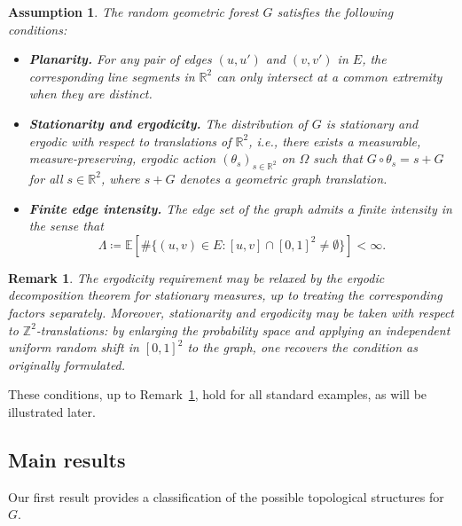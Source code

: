 \documentclass[a4paper, 11pt]{article} %
\theoremstyle{plain}
\newtheorem{remark}[theorem]{Remark}
\newtheorem{assumption}{Assumption}
\newcommand{\E}{\mathbb{E}}
\newcommand{\R}{\mathbb{R}}
\newcommand{\Z}{\mathbb{Z}}
\newcommand{\1}{\mathds 1}
\numberwithin{equation}{section}
\begin{document}
\begin{assumption}
    \label{assumptions}
    The random geometric forest $G$ satisfies the following conditions:
    \begin{itemize}
        \item\textbf{Planarity.} For any pair of edges $(u,u')$ and $(v, v')$ in $E$, the corresponding line segments in $\R^2$ can only intersect at a common extremity when they are distinct.
        \item\textbf{Stationarity and ergodicity.} The distribution of $G$ is stationary and ergodic with respect to translations of $\R^2$, i.e., there exists a measurable, measure-preserving, ergodic action $(\theta_s)_{s\in\R^2}$ on $\Omega$ such that $G\circ\theta_s=s+G$ for all $s\in\R^2$, where $s+G$ denotes a geometric graph translation.
        \item\textbf{Finite edge intensity.} The edge set of the graph admits a finite intensity in the sense that 
            \begin{equation}
                \label{eq_Lambda_def}
                \Lambda\coloneqq\E[\#\{(u, v)\in E:[u,v]\cap[0,1]^2\neq\emptyset\}]<\infty.
            \end{equation}
    \end{itemize}
\end{assumption}


\begin{remark}
    \label{remark_ergodicity_stationarity}
    The \emph{ergodicity} requirement may be relaxed by the ergodic decomposition theorem for stationary measures, up to treating the corresponding factors separately. Moreover, \emph{stationarity and ergodicity} may be taken with respect to $\Z^2$-translations: by enlarging the probability space and applying an independent uniform random shift in $[0,1]^2$ to the graph, one recovers the condition as originally formulated.
\end{remark}


These conditions, up to Remark~\ref{remark_ergodicity_stationarity}, hold for all standard examples, as will be illustrated later.


\subsection*{Main results}


Our first result provides a classification of the possible topological structures for $G$.
\end{document}
